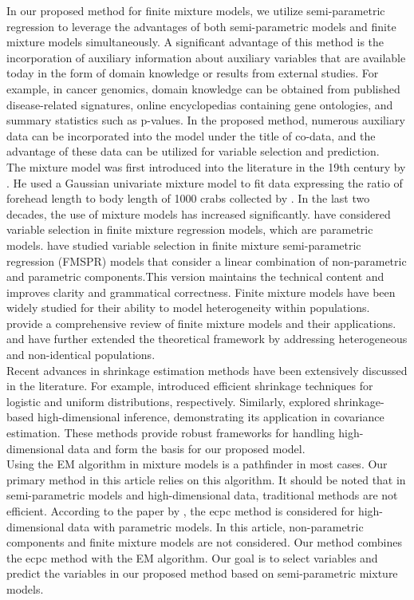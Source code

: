 In our proposed method for finite mixture models, we utilize semi-parametric regression to leverage the advantages of both semi-parametric models and finite mixture models simultaneously. A significant advantage of this method is the incorporation of auxiliary information about auxiliary variables that are available today in the form of domain knowledge or results from external studies. For example, in cancer genomics, domain knowledge can be obtained from published disease-related signatures, online encyclopedias containing gene ontologies, and summary statistics such as p-values. In the proposed method, numerous auxiliary data can be incorporated into the model under the title of co-data, and the advantage of these data can be utilized for variable selection and prediction.\\
The mixture model was first introduced into the literature in the 19th century by \cite{Pearson1894}. He used a Gaussian univariate mixture model to fit data expressing the ratio of forehead length to body length of 1000 crabs collected by \cite{Weldon1892}. In the last two decades, the use of mixture models has increased significantly. \hbox{\cite{Khalili-Chen2007}} have considered variable selection in finite mixture regression models, which are parametric models. \hbox{\cite{Ormoz-Eskandari2013}} have studied variable selection in finite mixture semi-parametric regression (FMSPR) models that consider a linear combination of non-parametric and parametric components.This version maintains the technical content and improves clarity and grammatical correctness. Finite mixture models have been widely studied for their ability to model heterogeneity within populations. 
\cite{McLachlan2019}
provide a comprehensive review of finite mixture models and their applications. 
\cite{Elsawah2018} 
and 
\cite{Alawady2016} 
have further extended the theoretical framework by addressing heterogeneous and non-identical populations.\\
Recent advances in shrinkage estimation methods have been extensively discussed in the literature. For example, 
\cite{Gupta2024}
introduced efficient shrinkage techniques for logistic and uniform distributions, respectively. 
Similarly, 
\cite{Bodnar2022} 
explored shrinkage-based high-dimensional inference, demonstrating its application in covariance estimation. 
These methods provide robust frameworks for handling high-dimensional data and form the basis for our proposed model.\\
Using the EM algorithm in mixture models is a pathfinder in most cases. Our primary method in this article relies on this algorithm. It should be noted that in semi-parametric models and high-dimensional data, traditional methods are not efficient. According to the paper by \hbox{\cite{Vannee2021}}, the ecpc method is considered for high-dimensional data with parametric models. In this article, non-parametric components and finite mixture models are not considered. Our method combines the ecpc method with the EM algorithm. Our goal is to select variables and predict the variables in our proposed method based on semi-parametric mixture models.\\
